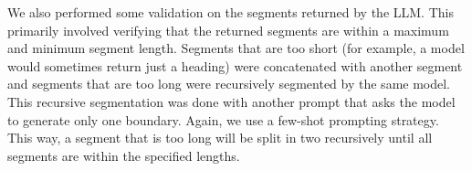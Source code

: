 We also performed some validation on the segments returned by the LLM. This primarily involved verifying that the returned segments are within a maximum and minimum segment length. Segments that are too short (for example, a model would sometimes return just a heading) were concatenated with another segment and segments that are too long were recursively segmented by the same model. This recursive segmentation was done with another prompt that asks the model to generate only one boundary. Again, we use a few-shot prompting strategy. This way, a segment that is too long will be split in two recursively until all segments are within the specified lengths.